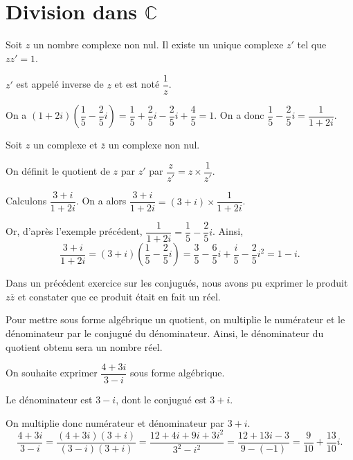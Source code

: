 \documentclass[11pt,fleqn, openany]{book} %
\begin{document}
\section{Division dans $\mathbb{C}$}

\begin{definition}Soit $z$ un nombre complexe non nul. Il existe un unique complexe $z'$ tel que $zz'=1$. 

$z'$ est appelé inverse de $z$ et est noté $\dfrac{1}{z}$.\end{definition}

\begin{example} On a $(1+2i)\left(\dfrac{1}{5}-\dfrac{2}{5}i\right)=\dfrac{1}{5}+\dfrac{2}{5}i-\dfrac{2}{5}i+\dfrac{4}{5}=1$. On a donc $\dfrac{1}{5}-\dfrac{2}{5}i=\dfrac{1}{1+2i}$.\end{example}


\begin{definition}Soit $z$ un complexe et $\overline{z}$ un complexe non nul. 

On définit le quotient de $z$ par $z'$ par  $\dfrac{z}{z'}=z \times \dfrac{1}{z'}$.\end{definition}

\begin{example} Calculons $\dfrac{3+i}{1+2i}$. On a alors $\dfrac{3+i}{1+2i} = (3+i) \times \dfrac{1}{1+2i}$.

Or, d'après l'exemple précédent, $\dfrac{1}{1+2i}=\dfrac{1}{5}-\dfrac{2}{5}i$. Ainsi,
\[ \dfrac{3+i}{1+2i} = (3+i)\left(\dfrac{1}{5}-\dfrac{2}{5}i\right) = \dfrac{3}{5}-\dfrac{6}{5}i+\dfrac{i}{5}-\dfrac{2}{5}i^2=1-i.\]\end{example}


Dans un précédent exercice sur les conjugués, nous avons pu exprimer le produit $z\overline{z}$ et constater que ce produit était en fait un réel.

Pour mettre sous forme algébrique un quotient, on multiplie le numérateur et le dénominateur par le conjugué du dénominateur. Ainsi, le dénominateur du quotient obtenu sera un nombre réel.

\begin{example}On souhaite exprimer $\dfrac{4+3i}{3-i}$ sous forme algébrique. 

Le dénominateur est $3-i$, dont le conjugué est $3+i$. 

On multiplie donc numérateur et dénominateur par $3+i$.
\[ \dfrac{4+3i}{3-i}= \dfrac{(4+3i)(3+i)}{(3-i)(3+i)}=\dfrac{12+4i+9i+3i^2}{3^2-i^2}=\dfrac{12+13i-3}{9-(-1)}=\dfrac{9}{10}+\dfrac{13}{10}i.\]\vspace{-0.5cm}\end{example}
\end{document}
